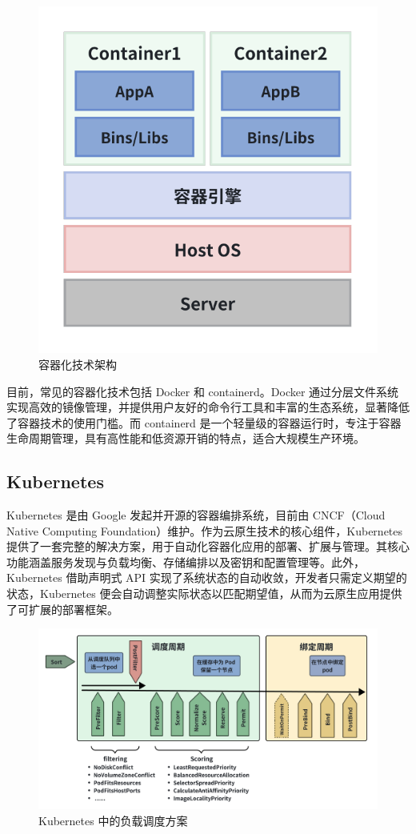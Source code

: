 \begin{figure}[ht]
  \centering
  \includegraphics[width=0.5\linewidth]{pics/2-2container.png}
  \caption{容器化技术架构\cite{urblik2024containerization}}
  \label{fig:2-2container}
\end{figure}

目前，常见的容器化技术包括 Docker 和 containerd。Docker 通过分层文件系统实现高效的镜像管理，并提供用户友好的命令行工具和丰富的生态系统，显著降低了容器技术的使用门槛。而 containerd 是一个轻量级的容器运行时，专注于容器生命周期管理，具有高性能和低资源开销的特点，适合大规模生产环境。

\subsection{Kubernetes}

Kubernetes 是由 Google 发起并开源的容器编排系统，目前由 CNCF（Cloud Native Computing Foundation）维护。作为云原生技术的核心组件，Kubernetes 提供了一套完整的解决方案，用于自动化容器化应用的部署、扩展与管理。其核心功能涵盖服务发现与负载均衡、存储编排以及密钥和配置管理等。此外，Kubernetes 借助声明式 API 实现了系统状态的自动收敛，开发者只需定义期望的状态，Kubernetes 便会自动调整实际状态以匹配期望值，从而为云原生应用提供了可扩展的部署框架。

\begin{figure}[ht]
  \centering
  \includegraphics[width=\linewidth]{pics/2-4k8sschedule.png}
  \caption{Kubernetes 中的负载调度方案\cite{kubernetes}}
  \label{fig:2-4k8sschedule}
\end{figure}

